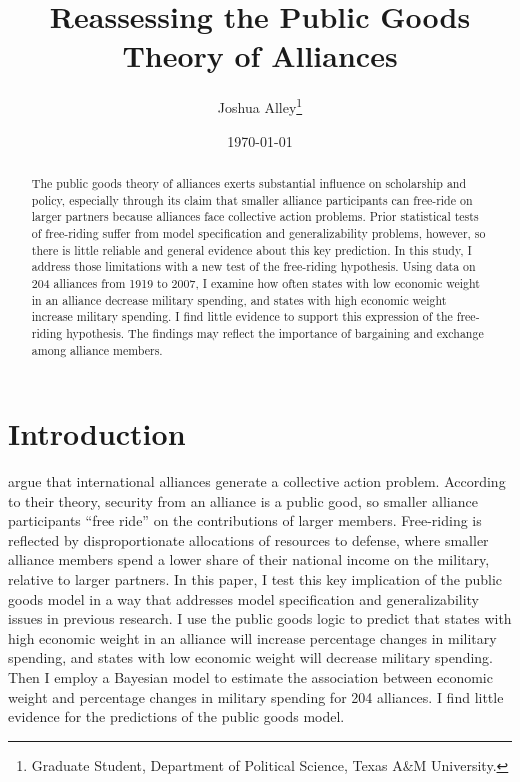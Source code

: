 \documentclass[12pt]{article}
\title{
\textbf{Reassessing the Public Goods Theory of Alliances}
	}
\author{Joshua Alley\footnote{Graduate Student,
Department of Political Science, Texas A\&M University.}}
\date{{\normalsize \today}}
\begin{document}
\maketitle 

\doublespace

\begin{abstract}
The public goods theory of alliances exerts substantial influence on scholarship and policy, especially through its claim that smaller alliance participants can free-ride on larger partners because alliances face collective action problems. 
Prior statistical tests of free-riding suffer from model specification and generalizability problems, however, so there is little reliable and general evidence about this key prediction.
In this study, I address those limitations with a new test of the free-riding hypothesis. 
Using data on 204 alliances from 1919 to 2007, I examine how often states with low economic weight in an alliance decrease military spending, and states with high economic weight increase military spending. 
I find little evidence to support this expression of the free-riding hypothesis. 
The findings may reflect the importance of bargaining and exchange among alliance members. 
\end{abstract} 

\newpage


\section{Introduction}



\citet{OlsonZeckhauser1966} argue that international alliances generate a collective action problem. 
According to their theory, security from an alliance is a public good, so smaller alliance participants ``free ride'' on the contributions of larger members. 
Free-riding is reflected by disproportionate allocations of resources to defense, where smaller alliance members spend a lower share of their national income on the military, relative to larger partners.
In this paper, I test this key implication of the public goods model in a way that addresses model specification and generalizability issues in previous research. 
I use the public goods logic to predict that states with high economic weight in an alliance will increase percentage changes in military spending, and states with low economic weight will decrease military spending.
Then I employ a Bayesian model to estimate the association between economic weight and percentage changes in military spending for 204 alliances. 
I find little evidence for the predictions of the public goods model. 
\end{document}
